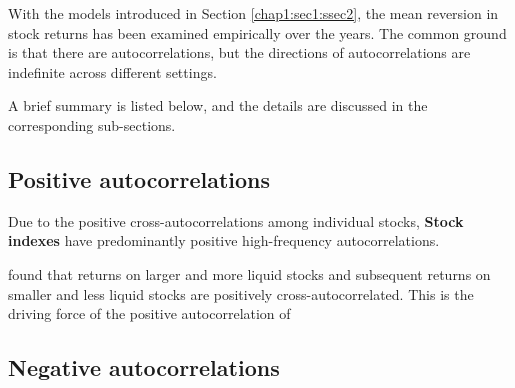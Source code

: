 With the models introduced in Section \ref{chap1:sec1:ssec2}, the mean reversion in stock returns
has been examined empirically over the years. The common ground is that there are autocorrelations,
but the directions of autocorrelations are indefinite across different settings.

A brief summary is listed below, and the details are discussed in the corresponding sub-sections.

\subsection{Positive autocorrelations}
Due to the positive cross-autocorrelations among individual stocks, \textbf{Stock indexes} have predominantly
positive high-frequency autocorrelations.

\citet{lo1988stock,lo1990contrarian} found that returns on larger and more liquid stocks and subsequent
returns on smaller and less liquid stocks are positively cross-autocorrelated. This is the driving force of 
the positive autocorrelation of 


\subsection{Negative autocorrelations}

